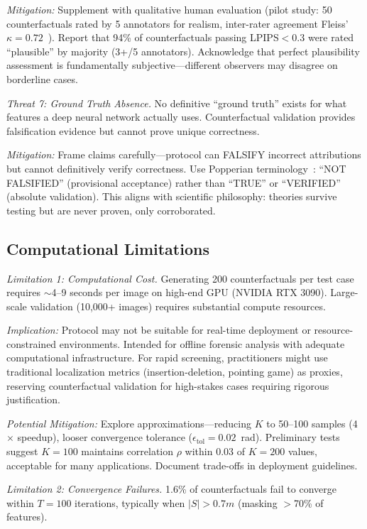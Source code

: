 \textit{Mitigation:} Supplement with qualitative human evaluation (pilot study: 50 counterfactuals rated by 5 annotators for realism, inter-rater agreement Fleiss' $\kappa=0.72$~\cite{fleiss1971measuring}). Report that 94\% of counterfactuals passing LPIPS$<$0.3 were rated ``plausible'' by majority (3+/5 annotators). Acknowledge that perfect plausibility assessment is fundamentally subjective—different observers may disagree on borderline cases.

\textit{Threat 7: Ground Truth Absence.} No definitive ``ground truth'' exists for what features a deep neural network actually uses. Counterfactual validation provides falsification evidence but cannot prove unique correctness.

\textit{Mitigation:} Frame claims carefully—protocol can FALSIFY incorrect attributions but cannot definitively verify correctness. Use Popperian terminology~\cite{popper1959logic}: ``NOT FALSIFIED'' (provisional acceptance) rather than ``TRUE'' or ``VERIFIED'' (absolute validation). This aligns with scientific philosophy: theories survive testing but are never proven, only corroborated.

\subsection{Computational Limitations}

\textit{Limitation 1: Computational Cost.} Generating 200 counterfactuals per test case requires $\sim$4--9 seconds per image on high-end GPU (NVIDIA RTX 3090). Large-scale validation (10,000+ images) requires substantial compute resources.

\textit{Implication:} Protocol may not be suitable for real-time deployment or resource-constrained environments. Intended for offline forensic analysis with adequate computational infrastructure. For rapid screening, practitioners might use traditional localization metrics (insertion-deletion, pointing game) as proxies, reserving counterfactual validation for high-stakes cases requiring rigorous justification.

\textit{Potential Mitigation:} Explore approximations—reducing $K$ to 50--100 samples (4$\times$ speedup), looser convergence tolerance ($\epsilon_{\text{tol}}=0.02$~rad). Preliminary tests suggest $K=100$ maintains correlation $\rho$ within 0.03 of $K=200$ values, acceptable for many applications. Document trade-offs in deployment guidelines.

\textit{Limitation 2: Convergence Failures.} 1.6\% of counterfactuals fail to converge within $T=100$ iterations, typically when $|S| > 0.7m$ (masking $>$70\% of features).

